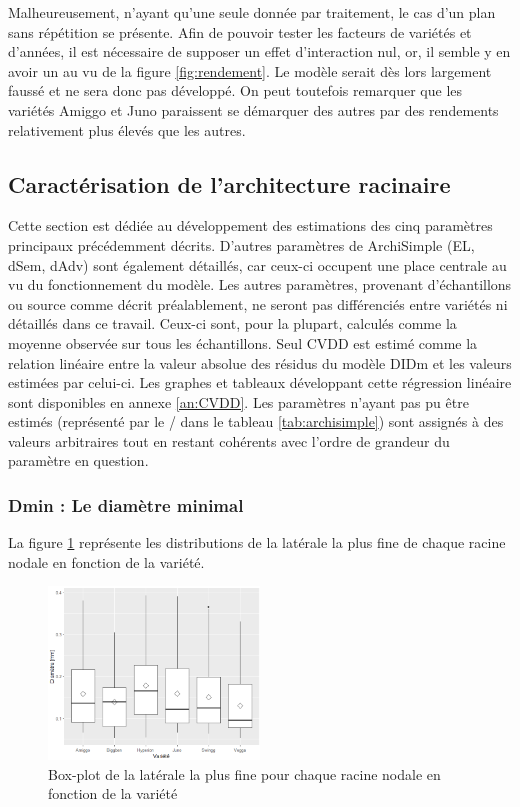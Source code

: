 Malheureusement, n'ayant qu'une seule donnée par traitement, le cas d'un plan sans répétition se présente.
Afin de pouvoir tester les facteurs de variétés et d'années, il est nécessaire de supposer un effet d'interaction nul, or, il semble y en avoir un au vu de la figure \ref{fig:rendement}.
Le modèle serait dès lors largement faussé et ne sera donc pas développé.
On peut toutefois remarquer que les variétés Amiggo et Juno paraissent se démarquer des autres par des rendements relativement plus élevés que les autres.

\subsection{Caractérisation de l'architecture racinaire}

Cette section est dédiée au développement des estimations des cinq paramètres principaux précédemment décrits.
D'autres paramètres de ArchiSimple (EL, dSem, dAdv) sont également détaillés, car ceux-ci occupent une place centrale au vu du fonctionnement du modèle.
Les autres paramètres, provenant d'échantillons ou source comme décrit préalablement, ne seront pas différenciés entre variétés ni détaillés dans ce travail.
Ceux-ci sont, pour la plupart, calculés comme la moyenne observée sur tous les échantillons.
Seul CVDD est estimé comme la relation linéaire entre la valeur absolue des résidus du modèle DIDm et les valeurs estimées par celui-ci.
Les graphes et tableaux développant cette régression linéaire sont disponibles en annexe \ref{an:CVDD}.
Les paramètres n'ayant pas pu être estimés (représenté par le / dans le tableau \ref{tab:archisimple}) sont assignés à des valeurs arbitraires tout en restant cohérents avec l'ordre de grandeur du paramètre en question.

\subsubsection{Dmin : Le diamètre minimal}

La figure \ref{fig:boxplot Dmin} représente les distributions de la latérale la plus fine de chaque racine nodale en fonction de la variété.

\begin{figure}[ht]
\centering
\includegraphics[width=0.5\textwidth]{Image/boxplot Dmin.png}
\caption{Box-plot de la latérale la plus fine pour chaque racine nodale en fonction de la variété}
\label{fig:boxplot Dmin}
\end{figure}

